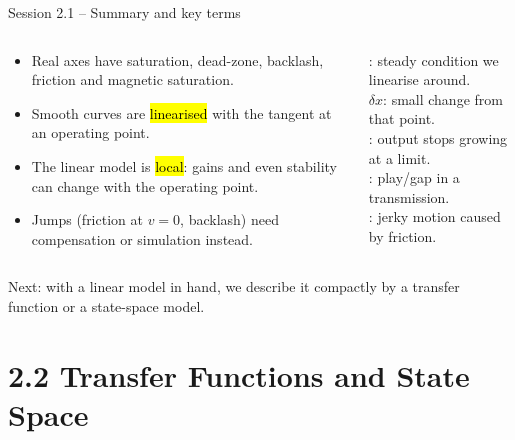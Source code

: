 \documentclass[aspectratio=169,10pt]{beamer}
\begin{document}
\begin{frame}{Session 2.1 -- Summary and key terms}
\begin{columns}[T]
\begin{keybox}
\footnotesize
\begin{itemize}
  \item Real axes have saturation, dead-zone, backlash, friction and magnetic saturation.
  \item Smooth curves are \hl{linearised} with the tangent at an operating point.
  \item The linear model is \hl{local}: gains and even stability can change with the operating point.
  \item Jumps (friction at $v=0$, backlash) need compensation or simulation instead.
\end{itemize}
\end{keybox}
\begin{defbox}
\footnotesize
{}: steady condition we linearise around.\\
 $\delta x$: small change from that point.\\
: output stops growing at a limit.\\
: play/gap in a transmission.\\
: jerky motion caused by friction.
\end{defbox}
\end{columns}
\begin{notebox}
Next: with a linear model in hand, we describe it compactly by a transfer function or a state-space model.
\end{notebox}
\end{frame}

\section{2.2 Transfer Functions and State Space}
\end{document}
